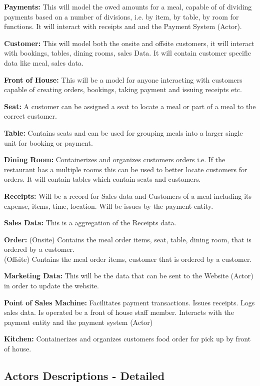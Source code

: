 \documentclass{article}
\begin{document}
\textbf{Payments:} This will model the owed amounts for a meal, capable of of dividing payments based on a number of divisions, i.e. by item, by table, by room for functions. It will interact with receipts and and the Payment System (Actor).

\textbf{Customer:} This will model both the onsite and offsite customers, it will interact with bookings, tables, dining rooms, sales Data. It will contain customer specific data like meal, sales data.

\textbf{Front of House:} This will be a model for anyone interacting with customers capable of creating orders, bookings, taking payment and issuing receipts etc.

\textbf{Seat:} A customer can be assigned a seat to locate a meal or part of a meal to the correct customer.

\textbf{Table:} Contains seats and can be used for grouping meals into a larger single unit for booking or payment.

\textbf{Dining Room:} Containerizes and organizes customers orders i.e. If the restaurant has a multiple rooms this can be used to better locate customers for orders. It will contain tables which contain seats and customers.

\textbf{Receipts:} Will be a record for Sales data and Customers of a meal including its expense, items, time, location. Will be issues by the payment entity.

\textbf{Sales Data:} This is a aggregation of the Receipts data.

\textbf{Order:} (Onsite) Contains the meal order items, seat, table, dining room, that is ordered by a customer. \\(Offsite) Contains the meal order items, customer that is ordered by a customer.

\textbf{Marketing Data:} This will be the data that can be sent to the Website (Actor) in order to update the website.

\textbf{Point of Sales Machine:} Facilitates payment transactions. Issues receipts. Logs sales data. Is operated be a front of house staff member. Interacts with the payment entity and the payment system (Actor)

\textbf{Kitchen:} Containerizes and organizes customers food order for pick up by front of house.



\subsection{Actors Descriptions - Detailed}
\end{document}
